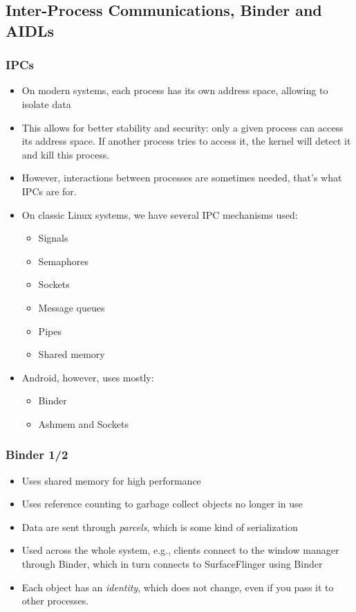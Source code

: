\subsection[IPCs, Binder and AIDLs]{Inter-Process Communications, Binder and AIDLs}
\begin{frame}
  \frametitle{IPCs}
  \begin{itemize}
  \item On modern systems, each process has its own address space,
    allowing to isolate data
  \item This allows for better stability and security: only a given
    process can access its address space. If another process tries to
    access it, the kernel will detect it and kill this process.
  \item However, interactions between processes are sometimes needed,
    that's what IPCs are for.
  \item On classic Linux systems, we have several IPC mechanisms used:
    \begin{itemize}
    \item Signals
    \item Semaphores
    \item Sockets
    \item Message queues
    \item Pipes
    \item Shared memory
    \end{itemize}
  \item Android, however, uses mostly:
    \begin{itemize}
    \item Binder
    \item Ashmem and Sockets
    \end{itemize}
  \end{itemize}
\end{frame}

\begin{frame}
  \frametitle{Binder 1/2}
  \begin{itemize}
  \item Uses shared memory for high performance
  \item Uses reference counting to garbage collect objects no longer
    in use
  \item Data are sent through \emph{parcels}, which is some kind of
    serialization
  \item Used across the whole system, e.g., clients connect to the
    window manager through Binder, which in turn connects to
    SurfaceFlinger using Binder
  \item Each object has an \emph{identity}, which does not change,
    even if you pass it to other processes.
  \end{itemize}
\end{frame}

